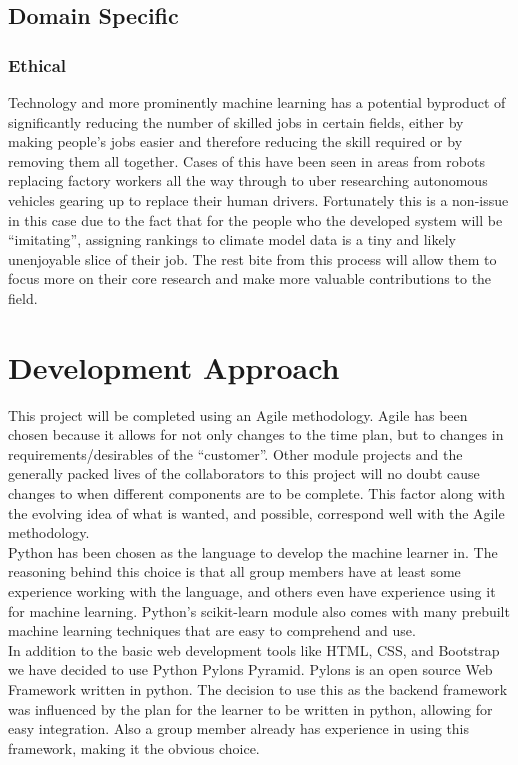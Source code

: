 \documentclass{ecmm427_assignment}
\begin{document}
\subsection{Domain Specific}

\subsubsection{Ethical}

\quad Technology and more prominently machine learning has 
a potential byproduct of significantly reducing the number of skilled
jobs in certain fields, either by making people's jobs easier and
therefore reducing the skill required or by removing them all together.
Cases of this have been seen in areas from robots replacing factory
workers all the way through to uber researching autonomous vehicles
gearing up to replace their human drivers. Fortunately this is a non-issue
in this case due to the fact that for the people who the developed
system will be ``imitating'', assigning rankings to climate model
data is a tiny and likely unenjoyable slice of their job. The rest bite
from this process will allow them to focus more on their core research
and make more valuable contributions to the field. 



\section{Development Approach}
\quad This project will be completed using an Agile methodology. Agile has been chosen because it allows for not only changes to the time plan, but to changes in requirements/desirables of the “customer”. Other module projects and the generally packed lives of the collaborators to this project will no doubt cause changes to when different components are to be complete. This factor along with the evolving idea of what is wanted, and possible, correspond well with the Agile methodology.\\

\quad Python has been chosen as the language to develop the machine learner in. The reasoning behind this choice is that all group members have at least some experience working with the language, and others even have experience using it for machine learning. Python’s scikit-learn module also comes with many prebuilt machine learning techniques that are easy to comprehend and use.\\

\quad In addition to the basic web development tools like HTML, CSS, and Bootstrap we have decided to use Python Pylons Pyramid. Pylons is an open source Web Framework written in python. The decision to use this as the backend framework was influenced by the plan for the learner to be written in python, allowing for easy integration. Also a group member already has experience in using this framework, making it the obvious choice.\\
\end{document}
